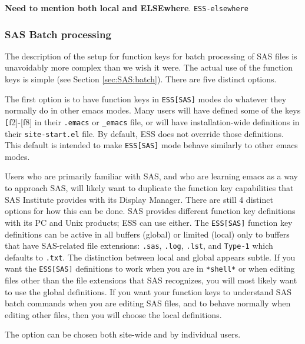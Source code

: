 \documentclass{article}
\begin{document}
\textbf{Need to mention both local and ELSEwhere}.  \texttt{ESS-elsewhere}

\subsubsection{SAS Batch processing}
\label{sec:SAS:proc:batch}

The description of the setup for function keys for batch processing of
SAS files is unavoidably more complex than we wish it were.  The actual
use of the function keys is simple (see Section \ref{sec:SAS:batch}).
There are five distinct options.

The first option is to have function keys in \texttt{ESS[SAS]} modes do
whatever they normally do in other emacs modes.  Many users will have
defined some of the keys {\texttt[f2]-[f8]} in their \verb+.emacs+ or
\verb|_emacs| file, or will have installation-wide definitions in
their \texttt{site-start.el} file.  By default, ESS does not override those
definitions.  This default is intended to make \texttt{ESS[SAS]} mode behave
similarly to other emacs modes.

Users who are primarily familiar with SAS, and who are learning emacs
as a way to approach SAS, will likely want to duplicate the function
key capabilities that SAS Institute provides with its Display Manager.
There are still 4 distinct options for how this can be done.  SAS
provides different function key definitions with its PC and Unix
products; ESS can use either.  The \texttt{ESS[SAS]} function key definitions
can be active in all buffers (global) or limited (local) only to
buffers that have SAS-related file extensions: \texttt{.sas}, \texttt{.log}, \texttt{.lst}, and
\texttt{Type-1} which defaults to \texttt{.txt}.  The distinction between local and
global appears subtle.  If you want the \texttt{ESS[SAS]} definitions to work
when you are in \texttt{*shell*} or when editing files other than the file
extensions that SAS recognizes, you will most likely want to use the
global definitions.  If you want your function keys to understand SAS
batch commands when you are editing SAS files, and to behave normally
when editing other files, then you will choose the local definitions.

The option can be chosen both site-wide and by individual users.

\end{document}
